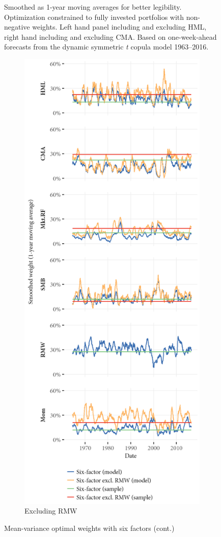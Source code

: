 \begin{figure}[htbp]
  \begin{longcaption}
    Smoothed as 1-year moving averages for better legibility. Optimization constrained to fully invested portfolios with non-negative weights. Left hand panel including and excluding HML, right hand including and excluding CMA. Based on one-week-ahead forecasts from the dynamic symmetric \emph{t} copula model 1963--2016.
  \end{longcaption}
\end{figure}

\begin{figure}[htbp]
  \ContinuedFloat
  \centering
  \begin{subfigure}{0.45\textwidth}
    \includegraphics[width=\textwidth]{graphics/weights/main_Weights_MV_6F_6F_EXCL_RMW.png}
    \caption{Excluding RMW}
  \end{subfigure}
  \footnotesize
  \caption{Mean-variance optimal weights with six factors (cont.)}
  \label{fig:mv_optimal_6}
\end{figure}



\FloatBarrier

